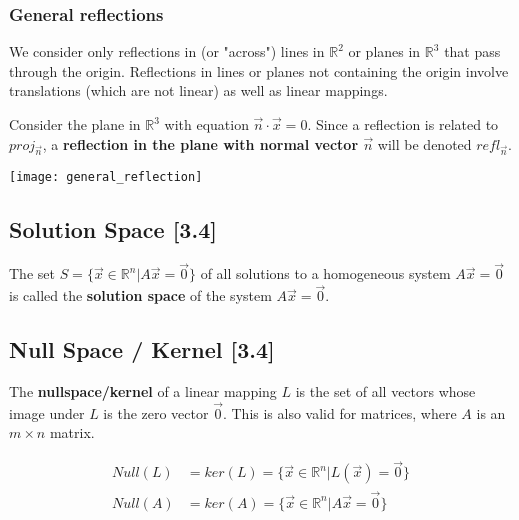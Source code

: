 \documentclass[a4paper,9pt]{extarticle}
\begin{document}
\begin{multicols*}{2}

\subsubsection{General reflections}
We consider only reflections in (or "across") lines in $\mathbb{R}^2$ or planes in $\mathbb{R}^3$ that pass through the origin. Reflections in lines or planes not containing the origin involve translations (which are not linear) as well as linear mappings.

Consider the plane in $\mathbb{R}^3$ with equation $\vec{n} \cdot \vec{x} = 0$. Since a reflection is related to $proj_{\vec{n}}$, a \textbf{reflection in the plane with normal vector $\vec{n}$} will be denoted \textbf{$refl_{\vec{n}}$}.

{\centering \texttt{[image: general\_reflection]} \par}


\subsection{Solution Space [3.4]}
The set $S = \{\vec{x} \in \mathbb{R}^n | A \vec{x} = \vec{0}\}$ of all solutions to a homogeneous system $A \vec{x} = \vec{0}$ is called the \textbf{solution space} of the system $A \vec{x} = \vec{0}$.


\subsection{Null Space / Kernel [3.4]}
The \textbf{nullspace/kernel} of a linear mapping $L$ is the set of all vectors whose image under $L$ is the zero vector $\vec{0}$. This is also valid for matrices, where $A$ is an $m \times n$ matrix.

\begin{equation} \label{3.4-1}
    \begin{split}
        Null(L) & = ker(L) = \{\vec{x} \in \mathbb{R}^n | L(\vec{x}) = \vec{0}\} \\
        Null(A) & = ker(A) = \{\vec{x} \in \mathbb{R}^n | A \vec{x} = \vec{0}\}
    \end{split}
\end{equation}



\end{multicols*}
\end{document}
